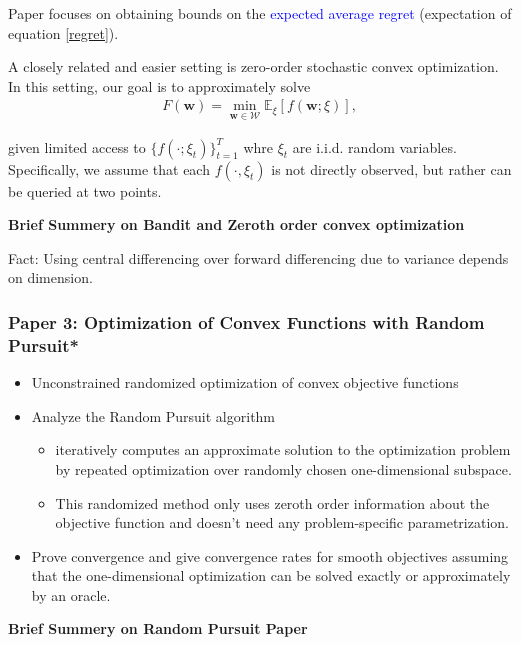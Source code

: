 \documentclass{article}
\begin{document}
Paper focuses on obtaining bounds on the \textcolor{blue}{expected average regret} (expectation of equation \eqref{regret}). \newline 

A closely related and easier setting is zero-order stochastic convex optimization. In this setting, our goal is to approximately solve
\begin{align}
    F(\mathbf{w}) = \min_{\mathbf{w} \in \mathcal{W}}\mathbb{E}_{\xi}[f(\mathbf{w};\xi)],
\end{align}

given limited access to $\{f(\cdot;\xi_t)\}_{t=1}^T$ whre $\xi_t$ are i.i.d. random variables. Specifically, we assume that each $f(\cdot, \xi_t)$ is not directly observed, but rather can be queried at two points. 

\begin{center} \textbf{Brief Summery on Bandit and Zeroth order convex optimization} \end{center}

Fact: Using central differencing over forward differencing due to variance depends on dimension.

\subsubsection{Paper 3: Optimization of Convex Functions with Random Pursuit*}

\begin{itemize}
    \item Unconstrained randomized optimization of convex objective functions
    \item Analyze the Random Pursuit algorithm
    \begin{itemize}
        \item iteratively computes an approximate solution to the optimization problem by repeated optimization over randomly chosen one-dimensional subspace.
        \item This randomized method only uses zeroth order information about the objective function and doesn't need any problem-specific parametrization.
    \end{itemize}
    \item Prove convergence and give convergence rates for smooth objectives assuming that the one-dimensional optimization can be solved exactly or approximately by an oracle. 
\end{itemize}


\begin{center} \textbf{Brief Summery on Random Pursuit Paper} \end{center}
\end{document}

